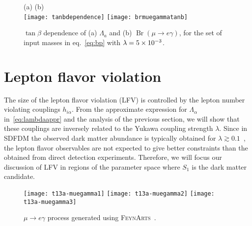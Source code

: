 \begin{figure}
\centering
(a) \hfill (b)\\
\texttt{[image: tanbdependence]}    
\texttt{[image: brmuegammatanb]}
\caption{$\tan\beta$ dependence of (a) $\Lambda_a$ and (b) $\operatorname{Br}(\mu \rightarrow e \gamma)$, for the set of input masses in eq.~\eqref{eq:bp} with
$\lambda=\num{5E-3}$.}
\label{fig:Lambdaa}
\end{figure}

\section{Lepton flavor violation}
\label{sec:lept-flav-viol}

The size of the lepton flavor violation (LFV) is controlled by the lepton
number violating couplings $h_{i\alpha}$.  
From the approximate expression for $\Lambda_{\alpha}$
in~\eqref{eq:lambdaappr} and the analysis of the previous section, we
will show that these couplings are inversely related to the Yukawa
coupling strength $\lambda$.
Since in SDFDM the observed dark matter abundance is typically
obtained for $\lambda\gtrsim 0.1$~\cite{Cheung:2013dua}, the lepton
flavor observables are not expected to give better constraints than
the obtained from direct detection experiments. Therefore, we will
focus our discussion of LFV in regions of the parameter space
where $S_1$ is the dark matter candidate.

\begin{figure}[h]
\label{fig:muegamma}
\centering
\texttt{[image: t13a-muegamma1]}
\texttt{[image: t13a-muegamma2]}
\texttt{[image: t13a-muegamma3]}
\caption{$\mu \to e \gamma$ process generated using \textsc{FeynArts}~\cite{Hahn:2000kx}.}
\end{figure}

